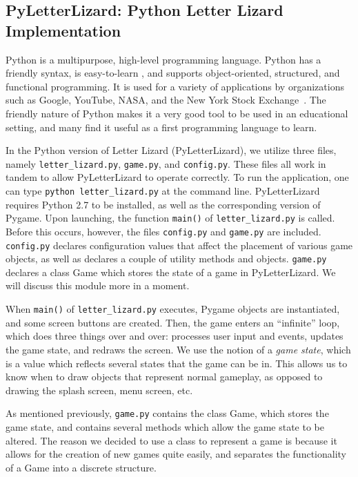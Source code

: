 
\subsection{PyLetterLizard: Python Letter Lizard Implementation}

Python is a multipurpose, high-level programming language. Python has a friendly syntax, is easy-to-learn \cite{about_python}, and supports object-oriented, structured, and functional programming. It is used for a variety of applications by organizations such as Google, YouTube, NASA, and the New York Stock Exchange~\cite{whatis_python}. The friendly nature of Python makes it a very good tool to be used in an educational setting, and many find it useful as a first programming language to learn.
		
	In the Python version of Letter Lizard (PyLetterLizard), we utilize three files, namely \texttt{letter\_lizard.py}, \texttt{game.py}, and \texttt{config.py}. These files all work in tandem to allow PyLetterLizard to operate correctly. To run the application, one can type \texttt{python letter\_lizard.py} at the command line. PyLetterLizard requires Python 2.7 to be installed, as well as the corresponding version of Pygame.  Upon launching, the function \texttt{main()} of \texttt{letter\_lizard.py} is called. Before this occurs, however, the files \texttt{config.py} and \texttt{game.py} are included. \texttt{config.py} declares configuration values that affect the placement of various game objects, as well as declares a couple of utility methods and objects. \texttt{game.py} declares a class Game which stores the state of a game in PyLetterLizard. We will discuss this module more in a moment.
	
	When \texttt{main()} of \texttt{letter\_lizard.py} executes, Pygame objects are instantiated, and some screen buttons are created. Then, the game enters an ``infinite'' loop, which does three things over and over: processes user input and events, updates the game state, and redraws the screen. We use the notion of a \emph{game state}, which is a value which reflects several states that the game can be in. This allows us to know when to draw objects that represent normal gameplay, as opposed to drawing the splash screen, menu screen, etc.
	
	As mentioned previously, \texttt{game.py} contains the class Game, which stores the game state, and contains several methods which allow the game state to be altered. The reason we decided to use a class to represent a game is because it allows for the creation of new games quite easily, and separates the functionality of a Game into a discrete structure.
	
